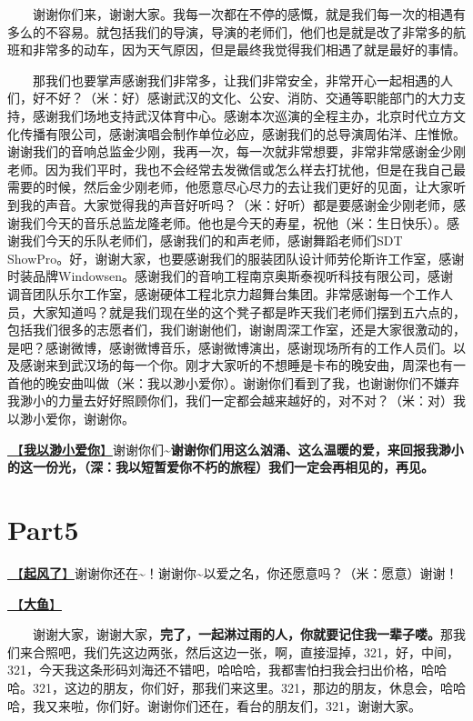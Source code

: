 \documentclass[]{ctexbook}
\begin{document}
  谢谢你们来，谢谢大家。我每一次都在不停的感慨，就是我们每一次的相遇有多么的不容易。就包括我们的导演，导演的老师们，他们也是就是改了非常多的航班和非常多的动车，因为天气原因，但是最终我觉得我们相遇了就是最好的事情。

  那我们也要掌声感谢我们非常多，让我们非常安全，非常开心一起相遇的人们，好不好？（米：好）感谢武汉的文化、公安、消防、交通等职能部门的大力支持，感谢我们场地支持武汉体育中心。感谢本次巡演的全程主办，北京时代立方文化传播有限公司，感谢演唱会制作单位必应，感谢我们的总导演周佑洋、庄惟惞。谢谢我们的音响总监金少刚，我再一次，每一次就非常想要，非常非常感谢金少刚老师。因为我们平时，我也不会经常去发微信或怎么样去打扰他，但是在我自己最需要的时候，然后金少刚老师，他愿意尽心尽力的去让我们更好的见面，让大家听到我的声音。大家觉得我的声音好听吗？（米：好听）都是要感谢金少刚老师，感谢我们今天的音乐总监龙隆老师。他也是今天的寿星，祝他（米：生日快乐）。感谢我们今天的乐队老师们，感谢我们的和声老师，感谢舞蹈老师们SDT ShowPro。好，谢谢大家，也要感谢我们的服装团队设计师劳伦斯许工作室，感谢时装品牌Windowsen。感谢我们的音响工程南京奥斯泰视听科技有限公司，感谢调音团队乐尔工作室，感谢硬体工程北京力超舞台集团。非常感谢每一个工作人员，大家知道吗？就是我们现在坐的这个凳子都是昨天我们老师们摆到五六点的，包括我们很多的志愿者们，我们谢谢他们，谢谢周深工作室，还是大家很激动的，是吧？感谢微博，感谢微博音乐，感谢微博演出，感谢现场所有的工作人员们。以及感谢来到武汉场的每一个你。刚才大家听的不想睡是卡布的晚安曲，周深也有一首他的晚安曲叫做（米：我以渺小爱你）。谢谢你们看到了我，也谢谢你们不嫌弃我渺小的力量去好好照顾你们，我们一定都会越来越好的，对不对？（米：对）我以渺小爱你，谢谢你。

\hyperref[loving-you-in-my-humble-way]{🎵【\textbf{我以渺小爱你}】}谢谢你们\textasciitilde{}\textbf{谢谢你们用这么汹涌、这么温暖的爱，来回报我渺小的这一份光，（深：我以短暂爱你不朽的旅程）我们一定会再相见的，再见。}

\section{Part5}\label{wuhan-20240727-part5}

\hyperref[the-wind-rises]{🎵【\textbf{起风了}】}谢谢你还在\textasciitilde！谢谢你\textasciitilde 以爱之名，你还愿意吗？（米：愿意）谢谢！

\hyperref[big-fish]{🎵【\textbf{大鱼}】}

  谢谢大家，谢谢大家，\textbf{完了，一起淋过雨的人，你就要记住我一辈子喽。}那我们来合照吧，我们先这边两张，然后这边一张，啊，直接湿掉，321，好，中间，321，今天我这条形码刘海还不错吧，哈哈哈，我都害怕扫我会扫出价格，哈哈哈。321，这边的朋友，你们好，那我们来这里。321，那边的朋友，休息会，哈哈哈，我又来啦，你们好。谢谢你们还在，看台的朋友们，321，谢谢大家。
\end{document}
